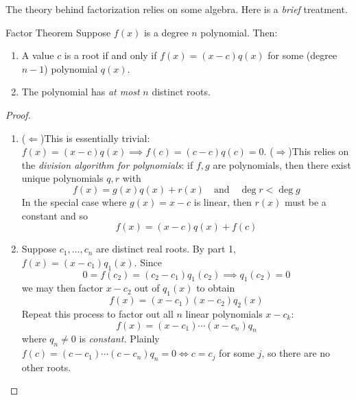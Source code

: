 \goodbreak



The theory behind factorization relies on some algebra. Here is a \emph{brief} treatment.

\begin{thm}{Factor Theorem}{}
Suppose $f(x)$ is a degree $n$ polynomial. Then:
\begin{enumerate}
  \item A value $c$ is a root if and only if $f(x)=(x-c)q(x)$ for some (degree $n-1$) polynomial $q(x)$.
  \item The polynomial has \emph{at most} $n$ distinct roots.
\end{enumerate} 
\end{thm}

\begin{proof}
\begin{enumerate}
  \item ($\Leftarrow$)\lstsp This is essentially trivial: $f(x)=(x-c)q(x)\implies f(c)=(c-c)q(c)=0$.\smallbreak
($\Rightarrow$)\lstsp This relies on the \emph{division algorithm for polynomials}: if $f,g$ are polynomials, then there exist unique polynomials $q,r$ with\footnotemark{}
\[f(x)=g(x)q(x)+r(x)\quad \text{and}\quad \deg r<\deg g\]
In the special case where $g(x)=x-c$ is linear, then $r(x)$ must be a constant and so
\[f(x)=(x-c)q(x)+f(c)\]
\item Suppose $c_1,\ldots,c_n$ are distinct real roots. By part 1, $f(x)=(x-c_1)q_1(x)$. Since
\[0=f(c_2)=(c_2-c_1)q_1(c_2)\implies q_1(c_2)=0\]
we may then factor $x-c_2$ out of $q_1(x)$ to obtain
\[f(x)=(x-c_1)(x-c_2)q_2(x)\]
Repeat this process to factor out all $n$ linear polynomials $x-c_k$:
\[f(x)=(x-c_1)\cdots(x-c_n)q_n\]
where $q_n\neq 0$ is \emph{constant.} Plainly $f(c)=(c-c_1)\cdots(c-c_n)q_n=0\iff c=c_j$  for some $j$, so there are no other roots.\qedhere
\end{enumerate}
\end{proof}

